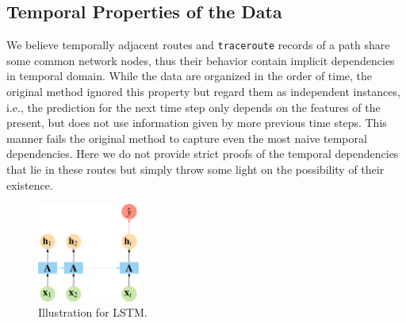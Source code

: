 \documentclass[sigconf]{acmart}
\begin{document}
	\subsection{Temporal Properties of the Data}
	We believe temporally adjacent routes and \texttt{traceroute} records of a path share some common network nodes, thus their behavior contain implicit dependencies in temporal domain. While the data are organized in the order of time, the original method ignored this property but regard them as independent instances, i.e., the prediction for the next time step only depends on the features of the present, but does not use information given by more previous time steps. This manner fails the original method to capture even the most naive temporal dependencies. Here we do not provide strict proofs of the temporal dependencies that lie in these routes but simply throw some light on the possibility of their existence.
	\begin{figure}[t] 
		\includegraphics[width=0.3\textwidth]{fig/lstm.pdf} 
		\caption{Illustration for LSTM.} 
		\label{fig:lstm} 
	\end{figure}
\end{document}
